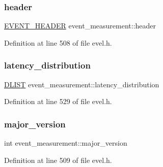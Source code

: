 \hypertarget{structevent__measurement_a08892ef3b557b44dcc5e203a2bbcc2c4}{}\label{structevent__measurement_a08892ef3b557b44dcc5e203a2bbcc2c4} 
\subsubsection{\texorpdfstring{header}{header}}
{\footnotesize\ttfamily \hyperlink{evel_8h_aa0ea94c675729365ea7825c4fc7e06d8}{E\+V\+E\+N\+T\+\_\+\+H\+E\+A\+D\+ER} event\+\_\+measurement\+::header}



Definition at line 508 of file evel.\+h.

\hypertarget{structevent__measurement_a6196660aa48b40e8a571b7d15152c519}{}\label{structevent__measurement_a6196660aa48b40e8a571b7d15152c519} 
\subsubsection{\texorpdfstring{latency\+\_\+distribution}{latency\_distribution}}
{\footnotesize\ttfamily \hyperlink{double__list_8h_a45f4a129042d9e1aa4ffd31fe13e4d14}{D\+L\+I\+ST} event\+\_\+measurement\+::latency\+\_\+distribution}



Definition at line 529 of file evel.\+h.

\hypertarget{structevent__measurement_a1d836edb847175d2d91b8571352a1dd6}{}\label{structevent__measurement_a1d836edb847175d2d91b8571352a1dd6} 
\subsubsection{\texorpdfstring{major\+\_\+version}{major\_version}}
{\footnotesize\ttfamily int event\+\_\+measurement\+::major\+\_\+version}



Definition at line 509 of file evel.\+h.

\hypertarget{structevent__measurement_ab617498b1c08049795022e7891da39aa}{}\label{structevent__measurement_ab617498b1c08049795022e7891da39aa} 
